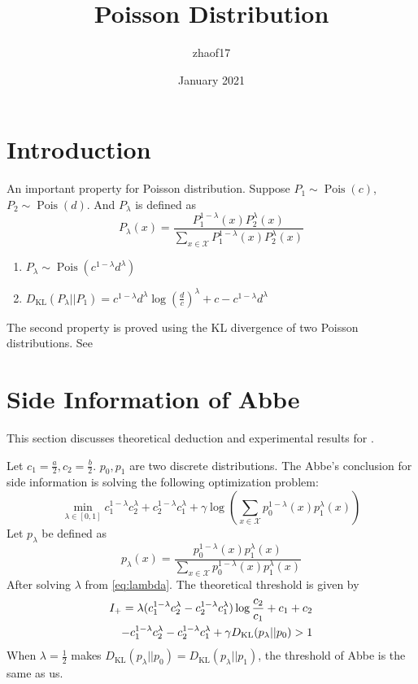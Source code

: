 \documentclass{article}
\title{Poisson Distribution}
\author{zhaof17 }
\date{January 2021}
\DeclareMathOperator{\Pois}{Pois}
\begin{document}
\maketitle

\section{Introduction}
An important property for Poisson distribution.
Suppose $P_1 \sim \Pois(c)$, $P_2 \sim \Pois(d)$.
And $P_{\lambda}$ is defined as 
$$
P_{\lambda}(x) = \frac{P_1^{1-\lambda}(x) P_2^{\lambda} (x)}
{\sum_{x \in \mathcal{X}}P_1^{1-\lambda}(x) P_2^{\lambda} (x)}
$$
\begin{enumerate}
    \item $P_{\lambda} \sim \Pois(c^{1-\lambda} d^{\lambda})$
    \item $D_{\mathrm{KL}}(P_{\lambda}||P_1) = c^{1-\lambda}d^{\lambda}\log(\frac{d}{c})^{\lambda} + c-c^{1-\lambda}d^{\lambda}$
\end{enumerate}
The second property is proved using the KL divergence
of two Poisson distributions. See \cite{kl}
\section{Side Information of Abbe}
This section discusses theoretical deduction and experimental results for \cite{abbe}.

Let $c_1 = \frac{a}{2}, c_2=\frac{b}{2}$. $p_0, p_1$ are two
discrete distributions.
The Abbe's conclusion for side information is solving the following
optimization problem:
\begin{equation}\label{eq:lambda}
    \min_{\lambda \in [0,1]} c_1^{1-\lambda}c_2^{\lambda} +
    c_2^{1-\lambda}c_1^{\lambda} + \gamma \log(\sum_{x\in \mathcal{X}}p^{1-\lambda}_0(x) p^{\lambda}_1(x))
\end{equation}
Let $p_{\lambda}$ be defined as
$$
p_{\lambda}(x) = \frac{p_0^{1-\lambda}(x) p_1^{\lambda} (x)}
{\sum_{x \in \mathcal{X}}p_0^{1-\lambda}(x) p_1^{\lambda} (x)}
$$
After solving $\lambda$ from \eqref{eq:lambda}. The theoretical
threshold is given by
\begin{align}
    I_+ =\lambda (c_1^{1-\lambda}c_2^{\lambda} -
    c_2^{1-\lambda}c_1^{\lambda})\log\frac{c_2}{c_1}+c_1+c_2\notag \\
    -c_1^{1-\lambda}c_2^{\lambda} -
    c_2^{1-\lambda}c_1^{\lambda}+\gamma D_{\mathrm{KL}}(p_{\lambda}||p_0)>1
\end{align}
When $\lambda=\frac{1}{2}$ makes $D_{\mathrm{KL}}(p_{\lambda}||p_0)=
D_{\mathrm{KL}}(p_{\lambda}||p_1)$, the threshold of Abbe is the same as
us.
\end{document}
